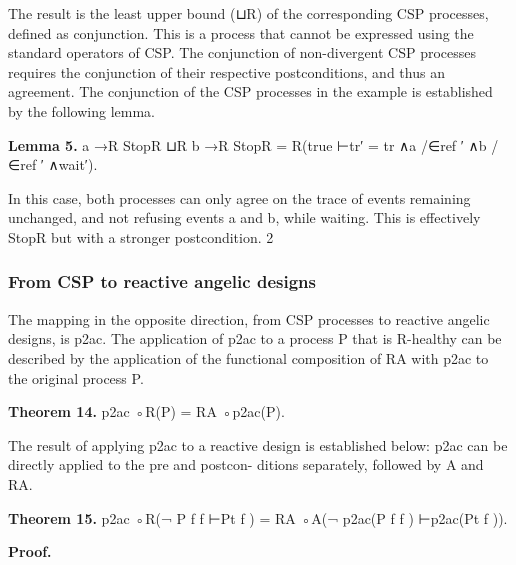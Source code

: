 \documentclass[11pt]{article}
\begin{document}
The result is the least upper bound (⊔R) of the corresponding CSP processes, defined as conjunction. This is a process that cannot be expressed using the standard operators of CSP. The conjunction of non-divergent CSP processes requires the conjunction of their respective postconditions, and thus an agreement. The conjunction of the CSP processes in the example is established by the following lemma.

\noindent\textbf{Lemma 5.} a →R StopR ⊔R b →R StopR = R(true ⊢tr′ = tr ∧a /∈ref ′ ∧b /∈ref ′ ∧wait′).


In this case, both processes can only agree on the trace of events remaining unchanged, and not refusing events a and b, while waiting. This is effectively StopR but with a stronger postcondition. 2

\subsubsection{From CSP to reactive angelic designs}
The mapping in the opposite direction, from CSP processes to reactive angelic designs, is p2ac. The application of p2ac to a process P that is R-healthy can be described by the application of the functional composition of RA with p2ac to the original process P.

\noindent\textbf{Theorem 14.} p2ac ◦R(P) = RA ◦p2ac(P).


The result of applying p2ac to a reactive design is established below: p2ac can be directly applied to the pre and postcon- ditions separately, followed by A and RA.

\noindent\textbf{Theorem 15.} p2ac ◦R(¬ P f f ⊢Pt f ) = RA ◦A(¬ p2ac(P f f ) ⊢p2ac(Pt f )).


\noindent\textbf{Proof.}
\end{document}
